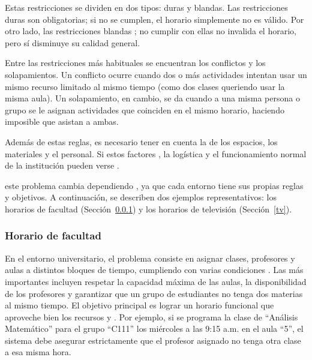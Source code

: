 \documentclass{article}
\begin{document}

Estas restricciones se dividen en dos tipos: duras y blandas. Las restricciones duras son obligatorias; si no se cumplen, el horario simplemente no es válido. Por otro lado, las restricciones blandas ; no cumplir con ellas no invalida el horario, pero sí disminuye su calidad general.

Entre las restricciones más habituales se encuentran los conflictos y los solapamientos. Un conflicto ocurre cuando dos o más actividades intentan usar un mismo recurso limitado al mismo tiempo (como dos clases queriendo usar la misma aula). Un solapamiento, en cambio, se da cuando a una misma persona o grupo se le asignan actividades que coinciden en el mismo horario, haciendo imposible que asistan a ambas.


Además de estas reglas, es necesario tener en cuenta la  de los espacios, los materiales y el personal. Si estos factores , la logística y el funcionamiento normal de la institución pueden verse .

 este problema cambia dependiendo , ya que cada entorno tiene sus propias reglas y objetivos. A continuación, se describen dos ejemplos representativos: los horarios de facultad (Sección~\ref{facultad}) y los horarios de televisión (Sección~\ref{tv}).

\subsubsection{Horario de facultad}
\label{facultad}

En el entorno universitario, el problema  consiste en asignar clases, profesores y aulas a distintos bloques de tiempo, cumpliendo con varias condiciones \cite{abdennadher2000, muller2005, babaei2015}. Las más importantes incluyen respetar la capacidad máxima de las aulas, la disponibilidad de los profesores y garantizar que un grupo de estudiantes no tenga dos materias al mismo tiempo. El objetivo principal es lograr un horario funcional que aproveche bien los recursos y . Por ejemplo, si se programa la clase de ``Análisis Matemático'' para el grupo ``C111'' los miércoles a las 9:15 a.m. en el aula ``5'', el sistema debe asegurar estrictamente que el profesor asignado no tenga otra clase a esa misma hora.
\end{document}
